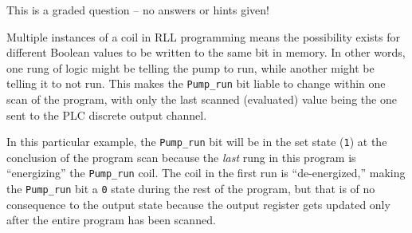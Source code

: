 \eject






This is a graded question -- no answers or hints given!







Multiple instances of a coil in RLL programming means the possibility exists for different Boolean values to be written to the same bit in memory.  In other words, one rung of logic might be telling the pump to run, while another might be telling it to not run.  This makes the {\tt Pump\_run} bit liable to change within one scan of the program, with only the last scanned (evaluated) value being the one sent to the PLC discrete output channel.

\vskip 10pt

In this particular example, the {\tt Pump\_run} bit will be in the set state ({\tt 1}) at the conclusion of the program scan because the {\it last} rung in this program is ``energizing'' the {\tt Pump\_run} coil.  The coil in the first run is ``de-energized,'' making the {\tt Pump\_run} bit a {\tt 0} state during the rest of the program, but that is of no consequence to the output state because the output register gets updated only after the entire program has been scanned.




